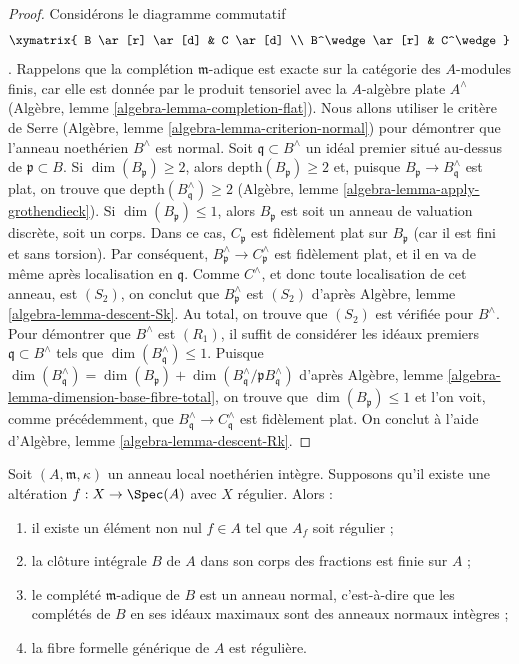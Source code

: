 \begin{proof} Considérons le diagramme commutatif $$
\xymatrix{
B \ar[r] \ar[d] & C \ar[d] \\
B^\wedge \ar[r] & C^\wedge
}
$$. Rappelons que la complétion $\mathfrak m$-adique est exacte sur la catégorie des $A$-modules finis, car elle est donnée par le produit tensoriel avec la $A$-algèbre plate $A^\wedge$ (Algèbre, lemme \ref{algebra-lemma-completion-flat}). Nous allons utiliser le critère de Serre (Algèbre, lemme \ref{algebra-lemma-criterion-normal}) pour démontrer que l'anneau noethérien $B^\wedge$ est normal. Soit $\mathfrak q \subset B^\wedge$ un idéal premier situé au-dessus de $\mathfrak p \subset B$. Si $\dim(B_\mathfrak p) \geq 2$, alors $\text{depth}(B_\mathfrak p) \geq 2$ et, puisque $B_\mathfrak p \to B^\wedge_\mathfrak q$ est plat, on trouve que $\text{depth}(B^\wedge_\mathfrak q) \geq 2$ (Algèbre, lemme \ref{algebra-lemma-apply-grothendieck}). Si $\dim(B_\mathfrak p) \leq 1$, alors $B_\mathfrak p$ est soit un anneau de valuation discrète, soit un corps. Dans ce cas, $C_\mathfrak p$ est fidèlement plat sur $B_\mathfrak p$ (car il est fini et sans torsion). Par conséquent, $B^\wedge_\mathfrak p \to C^\wedge_\mathfrak p$ est fidèlement plat, et il en va de même après localisation en $\mathfrak q$. Comme $C^\wedge$, et donc toute localisation de cet anneau, est $(S_2)$, on conclut que $B^\wedge_\mathfrak p$ est $(S_2)$ d'après Algèbre, lemme \ref{algebra-lemma-descent-Sk}. Au total, on trouve que $(S_2)$ est vérifiée pour $B^\wedge$. Pour démontrer que $B^\wedge$ est $(R_1)$, il suffit de considérer les idéaux premiers $\mathfrak q \subset B^\wedge$ tels que $\dim(B^\wedge_\mathfrak q) \leq 1$. Puisque $\dim(B^\wedge_\mathfrak q) = \dim(B_\mathfrak p) +
\dim(B^\wedge_\mathfrak q/\mathfrak p B^\wedge_\mathfrak q)$ d'après Algèbre, lemme \ref{algebra-lemma-dimension-base-fibre-total}, on trouve que $\dim(B_\mathfrak p) \leq 1$ et l'on voit, comme précédemment, que $B^\wedge_\mathfrak q \to C^\wedge_\mathfrak q$ est fidèlement plat. On conclut à l'aide d'Algèbre, lemme \ref{algebra-lemma-descent-Rk}. \end{proof}

\begin{lemma} \label{lemma-regular-alteration-implies-local} Soit $(A, \mathfrak m, \kappa)$ un anneau local noethérien intègre. Supposons qu'il existe une altération $f : X \to \Spec(A)$ avec $X$ régulier. Alors : \begin{enumerate} \item il existe un élément non nul $f \in A$ tel que $A_f$ soit régulier ; \item la clôture intégrale $B$ de $A$ dans son corps des fractions est finie sur $A$ ; \item le complété $\mathfrak m$-adique de $B$ est un anneau normal, c'est-à-dire que les complétés de $B$ en ses idéaux maximaux sont des anneaux normaux intègres ; \item la fibre formelle générique de $A$ est régulière. \end{enumerate} \end{lemma}


